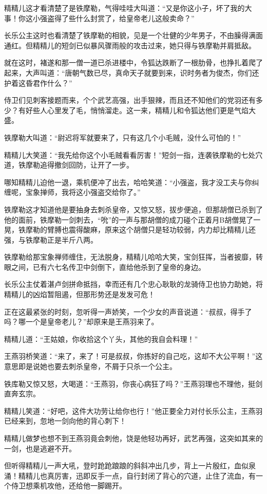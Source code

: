 \documentclass[12pt,oneside]{book}
\begin{document}
精精儿这才看清楚了是铁摩勒，气得哇哇大叫道：``又是你这小子，坏了我的大事！你这小强盗得了些什么封赏了，给皇帝老儿这般卖命？''

长乐公主这时也看清楚了铁摩勒的相貌，见是一个壮健的少年男子，不由臊得满面通红。但精精儿的短剑已似暴风骤雨般的攻击过来，她只得与铁摩勒并肩抵敌。

就在这时，褚遂和那一僧一道已杀进楼中，令狐达跌断了一根肋骨，也挣扎着爬了起来，大声叫道：``唐朝气数已尽，真命天子就要到来，识时务者为俊杰，你们还护着这昏君作什么？''

侍卫们见刺客接题而来，个个武艺高强，出手狠辣，而且还不知他们的党羽还有多少？有好些人心里发了毛，悄悄溜走。这一来，精精儿和令狐达他们更是气焰大盛。

铁摩勒大叫道：``尉迟将军就要来了，只有这几个小毛贼，没什么可怕的！''

精精儿大笑道：``我先给你这个小毛贼看看厉害！''短剑一指，连袭铁摩勒的七处穴道，铁摩勒追得撤剑回防，让开了一步。

哪知精精儿迫他一退，乘机便冲了出去，哈哈笑道：``小强盗，我才没工夫与你纠缠呢，宝象掸师，我将这小强盗交给你了。''

铁摩勒这才知道他是要抽身去刺杀皇帝，又惊又怒，拔步便追，但那胡僧已杀到了他的面前，铁摩勒一剑刺去，``吮''的一声与那胡僧的成刀碰个正着月B胡僧晃了一晃，铁摩勒的臂膊也震得酸麻，原来这个胡僧只是轻功较弱，内力却比精精儿还强，与铁摩勒正是半斤八两。

铁摩勒给那宝象禅师缠住，无法脱身，精精儿哈哈大笑，宝剑狂挥，当者披靡，转眼之间，已有六七名传卫中剑倒下，直给他杀到了皇帝的身边。

长乐公主仗着湛卢剑拼命抵挡，幸而还有几个忠心耿耿的龙骑侍卫也协力助她，将精精儿的凶焰暂阻遏，但那形势还是发发可危！

正在这最紧张的时刻，忽听得一声娇笑，一个少女的声音说道：``叔叔，得手了吗？哪一个是皇帝老儿？''却原来是王燕羽来了。

精精儿道：``王姑娘，你收拾这个丫头，其他的我自会料理！''

王燕羽桥笑道：``来了，来了！可是叔叔，你拣好的自己吃，这却不大公平啊！''这意思即是说她也要去刺杀皇帝，不屑于只杀一个公主。

铁库勒又惊又怒，大喝道：``王燕羽，你丧心病狂了吗？''王燕羽理也不理他，挺剑直奔玄宗。

精精儿笑道：``好吧，这件大功劳让给你也行！''他正要全力对付长乐公主，王燕羽已经来到，忽地一剑向他的背心刺下！

精精儿做梦也想不到王燕羽竟会刺他，饶是他轻功再好，武艺再强，这突如其来的一剑，也是逃避不开。

但听得精精儿一声大吼，登时跄跄踉踉的斜斜冲出几步，背上一片殷红，血似泉涌！精精儿也真厉害，迅即反手一点，自行封闭了背心的穴道，止住了流血，有一个侍卫想乘机攻他，还给他一脚踢开。
\end{document}
